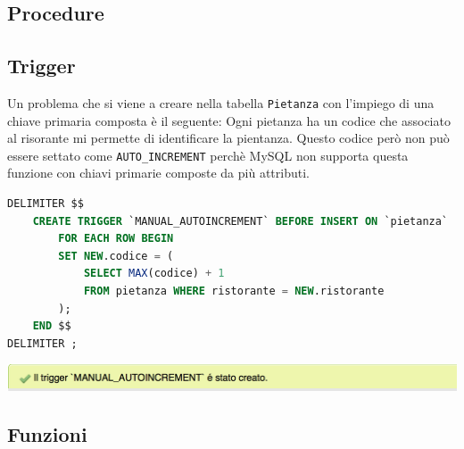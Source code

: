\documentclass[10pt]{article}
\begin{document}
		\subsection{Procedure}
		\subsection{Trigger}
		Un problema che si viene a creare nella tabella \texttt{Pietanza} con l'impiego di una chiave primaria composta \`e il seguente: Ogni pietanza ha un codice che associato al risorante mi permette di identificare la pientanza. Questo codice per\`o non pu\`o essere settato come \texttt{AUTO\_INCREMENT} perch\`e MySQL non supporta questa funzione con chiavi primarie composte da pi\`u attributi.
		\begin{lstlisting}[language=sql]
DELIMITER $$		
	CREATE TRIGGER `MANUAL_AUTOINCREMENT` BEFORE INSERT ON `pietanza`
		FOR EACH ROW BEGIN
		SET NEW.codice = (
			SELECT MAX(codice) + 1
			FROM pietanza WHERE ristorante = NEW.ristorante
		);
	END $$		
DELIMITER ;
\end{lstlisting}
\begin{center}
\hspace*{-1cm}
\includegraphics[scale=0.9]{trigger1.png}
\hspace*{-1cm}
\end{center}
		\subsection{Funzioni}
\end{document}
